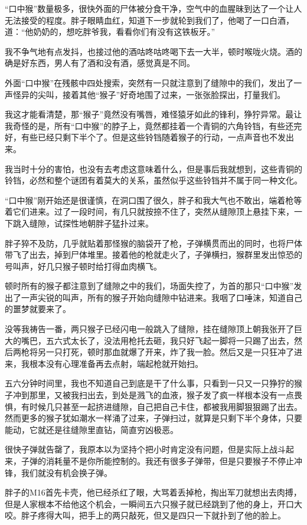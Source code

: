 “口中猴”数量极多，很快外面的尸体被分食干净，空气中的血腥昧到达了一个让人无法接受的程度。胖子眼睛血红，知道下一步就轮到我们了，他喝了一口白酒，道：“他奶奶的，想吃胖爷我，看看你们有没有这铁板牙。”

我不争气地有点发抖，也接过他的酒咕咚咕咚喝下去一大半，顿时喉咙火烧。酒的确是好东西，男人有了酒和没有酒，感觉真是不同。

外面“口中猴”在残骸中四处搜索，突然有一只就注意到了缝隙中的我们，发出了一声怪异的尖叫，接着其他“猴子”好奇地围了过来，一张张脸探出，打量我们。

我这才能看清楚，那“猴子”竟然没有嘴唇，难怪猿牙如此的锋利，狰狞异常。最让我奇怪的是，所有“口中猴”的脖子上，竟然都挂着一个青铜的六角铃铛，有些还完好，有些已经只剩下半个了。但是这些铃铛随着猴子的行动，一点声音也不发出来。

我当时十分的害怕，也没有去考虑这意味着什么，但是事后我就想到，这些青铜的铃铛，必然和整个谜团有着莫大的关系，虽然似乎这些铃铛并不属于同一种文化。

“口中猴”刚开始还是很谨慎，在洞口围了很久，胖子和我大气也不敢出，端着枪等着它们进来。过了一段时间，有几只就按捺不住了，突然从缝隙顶上悬挂下来，一下跳入缝隙，试探性地朝胖子猛扑过来。

胖子猝不及防，几乎就贴着那怪猴的脑袋开了枪，子弹横贯而出的同时，也将尸体带飞了出去，掉到尸体堆里。接着他的枪就走火了，子弹横扫，猴群里发出惊恐的号叫声，好几只猴子顿时给打得血肉横飞。

顿时所有的猴子都注意到了缝隙之中的我们，场面失控了，为首的那只“口中猴”发出了一声尖锐的叫声，所有的猴子开始向缝隙中钻进来。我咽了口唾沫，知道自己的噩梦就要来了。

没等我祷告一番，两只猴子已经闪电一般跳入了缝隙，挂在缝隙顶上朝我张开了巨大的嘴巴，五六式太长了，没法用枪托去砸，我只好飞起一脚将一只踢了出去，然后两枪将另一只打死，顿时那血就爆了开来，炸了我一脸。然后又是一只狂冲了进来，我根本没有心理准备再去点射，端起枪就开始扫。

五六分钟时间里，我也不知道自己到底是干了什么事，只看到一只又一只狰狞的猴子冲到那里，又被我扫出去，到处是溅飞的血液，猴子发了疯一样根本没有一点畏惧，有时候几只甚至一起挤进缝隙，自己把自己卡住，都被我用脚狠狠踢了出去。然而更多的猴子犹如潮水一样涌了过来，子弹扫过，就算是只剩下半个身体，只要能动，它就还是往缝隙里直钻，简直穷凶极恶。

很快子弹就告罄了，我原本以为坚持个把小时肯定没有问题，但是实际上战斗起来，子弹的消耗量不是你所能控制的。我还有很多子弹带，但是只要猴子不停止冲锋，我们就没有机会换子弹。

胖子的M16首先卡壳，他已经杀红了眼，大骂着丢掉枪，掏出军刀就想出去肉搏，但是人家根本不给他这个机会，一瞬间五六只猴子就已经跳到了他的身上，开口大咬。胖子疼得大叫，把手上的两只敲死，但又是四只一下就扑到了他的脸上。

